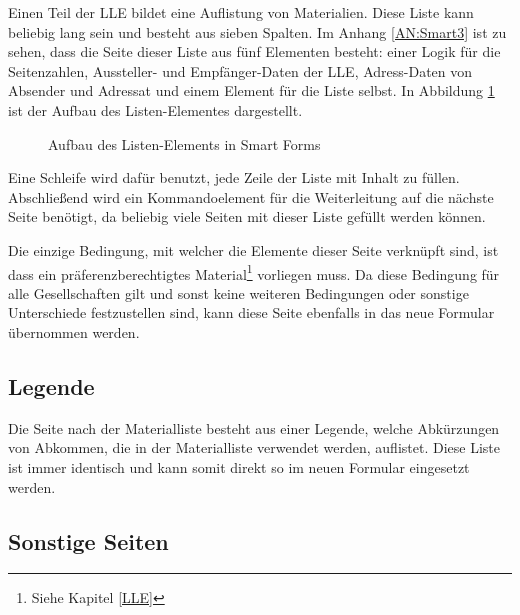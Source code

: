 	Einen Teil der \ac{LLE} bildet eine Auflistung von Materialien. Diese Liste kann beliebig lang sein und besteht aus sieben Spalten. Im Anhang \ref{AN:Smart3} ist zu sehen, dass die Seite dieser Liste aus fünf Elementen besteht: einer Logik für die Seitenzahlen, Aussteller- und Empfänger-Daten der \ac{LLE}, Adress-Daten von Absender und Adressat und einem Element für die Liste selbst.
	In Abbildung \ref{list_smart} ist der Aufbau des Listen-Elementes dargestellt.
	
	\begin{figure}[ht]
		\centering
		\caption{Aufbau des Listen-Elements in Smart Forms}
		\label{list_smart}
	\end{figure}
	
	Eine Schleife wird dafür benutzt, jede Zeile der Liste mit Inhalt zu füllen. Abschließend wird ein Kommandoelement für die Weiterleitung auf die nächste Seite benötigt, da beliebig viele Seiten mit dieser Liste gefüllt werden können.
	
	Die einzige Bedingung, mit welcher die Elemente dieser Seite verknüpft sind, ist dass ein präferenzberechtigtes Material\footnote{Siehe Kapitel \ref{LLE}} vorliegen muss. Da diese Bedingung für alle Gesellschaften gilt und sonst keine weiteren Bedingungen oder sonstige Unterschiede festzustellen sind, kann diese Seite ebenfalls in das neue Formular übernommen werden. 
	
	\subsection{Legende}
	\label{ist:leg}
	
	Die Seite nach der Materialliste besteht aus einer Legende, welche Abkürzungen von Abkommen, die in der Materialliste verwendet werden, auflistet. Diese Liste ist immer identisch und kann somit direkt so im neuen Formular eingesetzt werden.
	
	
	\subsection{Sonstige Seiten}
	
